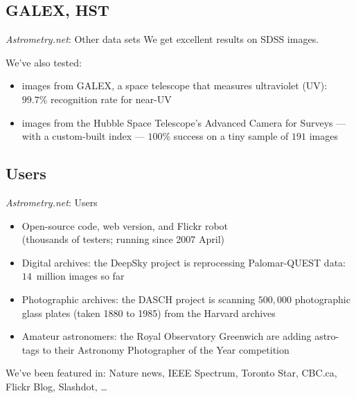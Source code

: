 \documentclass[compress]{beamer}
\newcommand{\an}{\emph{Astrometry.net}\xspace}
\begin{document}
\subsection{GALEX, HST}

\begin{frame}{\an: Other data sets}
  We get excellent results on SDSS images.
  \vspace{12pt}

  We've also tested:
  \begin{itemize}
    \addtolength{\itemsep}{0.5ex}
  \item images from \alert{GALEX}, a space telescope that measures
    ultraviolet (UV): \alert{$99.7\%$} recognition rate for near-UV
  \item images from the \alert{Hubble Space Telescope}'s Advanced
    Camera for Surveys --- with a custom-built index ---
    \alert{$100\%$} success on a tiny sample of $191$ images
  \end{itemize}
\end{frame}


\subsection{Users}

\begin{frame}{\an: Users}
  \begin{itemize}
    \addtolength{\itemsep}{0.5ex}
  \item Open-source code, web version, and Flickr robot \\
    (thousands of testers; running since 2007 April)
  \item Digital archives: the DeepSky project is reprocessing
    Palomar-QUEST data: \alert{\mbox{$14$ million}} images so far
  \item Photographic archives: the DASCH project is scanning \alert{$500,\!000$
    photographic glass plates} (taken 1880 to 1985) from the Harvard
    archives
  \item Amateur astronomers: the Royal Observatory Greenwich are
    adding \alert{astro-tags} to their Astronomy Photographer of the Year
    competition
  \end{itemize}
  \vspace{10pt}

  We've been featured in: Nature news, IEEE Spectrum, Toronto Star, CBC.ca, Flickr Blog, Slashdot, \ldots
  
\end{frame}
\end{document}
